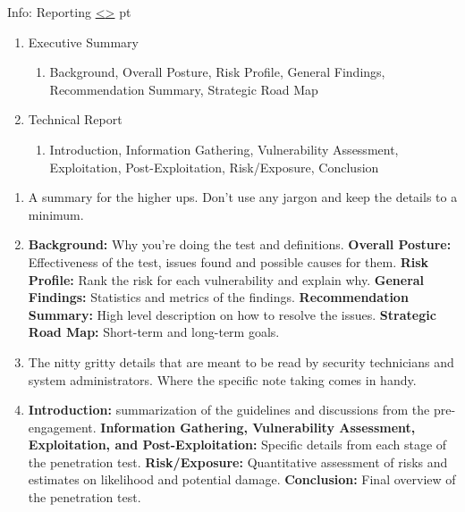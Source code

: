 \documentclass[12pt]{extarticle}
\newenvironment{instructionblock}{\Large\bgroup}{\egroup}
\newcounter{next}
\newcounter{prev}
\begin{document}
\pagebreak
{}
\begin{slide}{Info: Reporting}
{\hyperref[slide \theprev]{\textless}\hyperref[slide \thenext]{\textgreater}}
	 pt
	\begin{instructionblock}
		\begin{enumerate}
            \item Executive Summary
            	\begin{enumerate}
            		\item Background, Overall Posture, Risk Profile, General Findings, Recommendation Summary, Strategic Road Map
            	\end{enumerate}
            \item Technical Report
            	\begin{enumerate}
            		\item Introduction, Information Gathering, Vulnerability Assessment, Exploitation, Post-Exploitation, Risk/Exposure, Conclusion 
            	\end{enumerate}
		\end{enumerate}
	\end{instructionblock}
\end{slide}
\begin{enumerate}
\item A summary for the higher ups. Don't use any jargon and keep the details to a minimum.\cite[Chapter 0]{Ref:Weidman}
\item \textbf{Background:} Why you're doing the test and definitions. \textbf{Overall Posture:} Effectiveness of the test, issues found and possible causes for them. \textbf{Risk Profile:} Rank the risk for each vulnerability and explain why. \textbf{General Findings:} Statistics and metrics of the findings. \textbf{Recommendation Summary:} High level description on how to resolve the issues. \textbf{Strategic Road Map:} Short-term and long-term goals.\cite[Chapter 0]{Ref:Weidman}
\item The nitty gritty details that are meant to be read by security technicians and system administrators. Where the specific note taking comes in handy.\cite[Chapter 0]{Ref:Weidman}
\item \textbf{Introduction:} summarization of the guidelines and discussions from the pre-engagement. \cite[Chapter 0]{Ref:Weidman}
\textbf{Information Gathering, Vulnerability Assessment, Exploitation, and Post-Exploitation:} Specific details from each stage of the penetration test. \textbf{Risk/Exposure:} Quantitative assessment of risks and estimates on likelihood and potential damage. \textbf{Conclusion:} Final overview of the penetration test.\cite[Chapter 0]{Ref:Weidman}
\end{enumerate}
\end{document}
